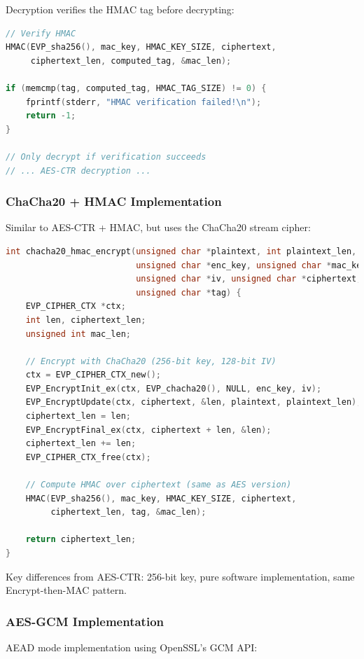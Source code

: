 \documentclass[12pt,a4paper]{article}
\begin{document}
Decryption verifies the HMAC tag before decrypting:
\begin{lstlisting}[language=C, caption=AES-CTR + HMAC decryption (verification)]
// Verify HMAC
HMAC(EVP_sha256(), mac_key, HMAC_KEY_SIZE, ciphertext, 
     ciphertext_len, computed_tag, &mac_len);

if (memcmp(tag, computed_tag, HMAC_TAG_SIZE) != 0) {
    fprintf(stderr, "HMAC verification failed!\n");
    return -1;
}

// Only decrypt if verification succeeds
// ... AES-CTR decryption ...
\end{lstlisting}

\subsubsection{ChaCha20 + HMAC Implementation}
Similar to AES-CTR + HMAC, but uses the ChaCha20 stream cipher:

\begin{lstlisting}[language=C, caption=ChaCha20 + HMAC encryption]
int chacha20_hmac_encrypt(unsigned char *plaintext, int plaintext_len,
                          unsigned char *enc_key, unsigned char *mac_key,
                          unsigned char *iv, unsigned char *ciphertext,
                          unsigned char *tag) {
    EVP_CIPHER_CTX *ctx;
    int len, ciphertext_len;
    unsigned int mac_len;
    
    // Encrypt with ChaCha20 (256-bit key, 128-bit IV)
    ctx = EVP_CIPHER_CTX_new();
    EVP_EncryptInit_ex(ctx, EVP_chacha20(), NULL, enc_key, iv);
    EVP_EncryptUpdate(ctx, ciphertext, &len, plaintext, plaintext_len);
    ciphertext_len = len;
    EVP_EncryptFinal_ex(ctx, ciphertext + len, &len);
    ciphertext_len += len;
    EVP_CIPHER_CTX_free(ctx);
    
    // Compute HMAC over ciphertext (same as AES version)
    HMAC(EVP_sha256(), mac_key, HMAC_KEY_SIZE, ciphertext, 
         ciphertext_len, tag, &mac_len);
    
    return ciphertext_len;
}
\end{lstlisting}

Key differences from AES-CTR: 256-bit key, pure software implementation, same Encrypt-then-MAC pattern.

\subsubsection{AES-GCM Implementation}
AEAD mode implementation using OpenSSL's GCM API:
\end{document}
